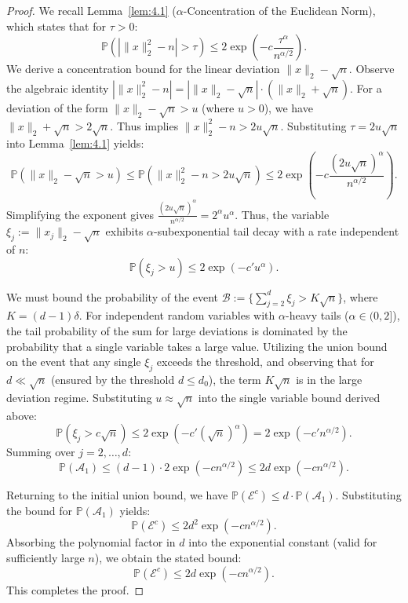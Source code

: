 \documentclass[11pt]{amsart}
\theoremstyle{definition}
\theoremstyle{remark}
\begin{document}
\begin{proof}
We recall Lemma~\ref{lem:4.1} ($\alpha$-Concentration of the Euclidean Norm), which states that for $\tau > 0$:
\begin{equation}
\mathbb{P}(|\|x\|_2^2 - n| > \tau) \le 2 \exp\left( -c \frac{\tau^\alpha}{n^{\alpha/2}} \right).
\end{equation}
We derive a concentration bound for the linear deviation $\|x\|_2 - \sqrt{n}$. Observe the algebraic identity $|\|x\|_2^2 - n| = |\|x\|_2 - \sqrt{n}| \cdot (\|x\|_2 + \sqrt{n})$. For a deviation of the form $\|x\|_2 - \sqrt{n} > u$ (where $u > 0$), we have $\|x\|_2 + \sqrt{n} > 2\sqrt{n}$. Thus implies $\|x\|_2^2 - n > 2u\sqrt{n}$. Substituting $\tau = 2u\sqrt{n}$ into Lemma~\ref{lem:4.1} yields:
\begin{equation}
\mathbb{P}(\|x\|_2 - \sqrt{n} > u) \le \mathbb{P}(\|x\|_2^2 - n > 2u\sqrt{n}) \le 2 \exp\left( -c \frac{(2u\sqrt{n})^\alpha}{n^{\alpha/2}} \right).
\end{equation}
Simplifying the exponent gives $\frac{(2u\sqrt{n})^\alpha}{n^{\alpha/2}} = 2^\alpha u^\alpha$. Thus, the variable $\xi_j := \|x_j\|_2 - \sqrt{n}$ exhibits $\alpha$-subexponential tail decay with a rate independent of $n$:
\begin{equation}
\mathbb{P}(\xi_j > u) \le 2 \exp(-c' u^\alpha).
\end{equation}

We must bound the probability of the event $\mathcal{B} := \{ \sum_{j=2}^d \xi_j > K \sqrt{n} \}$, where $K = (d-1)\delta$. For independent random variables with $\alpha$-heavy tails ($\alpha \in (0, 2]$), the tail probability of the sum for large deviations is dominated by the probability that a single variable takes a large value. Utilizing the union bound on the event that any single $\xi_j$ exceeds the threshold, and observing that for $d \ll \sqrt{n}$ (ensured by the threshold $d \le d_0$), the term $K\sqrt{n}$ is in the large deviation regime. Substituting $u \approx \sqrt{n}$ into the single variable bound derived above:
\begin{equation}
\mathbb{P}(\xi_j > c \sqrt{n}) \le 2 \exp(-c' (\sqrt{n})^\alpha) = 2 \exp(-c' n^{\alpha/2}).
\end{equation}
Summing over $j=2, \dots, d$:
\begin{equation}
\mathbb{P}(\mathcal{A}_1) \le (d-1) \cdot 2 \exp(-c n^{\alpha/2}) \le 2d \exp(-c n^{\alpha/2}).
\end{equation}

Returning to the initial union bound, we have $\mathbb{P}(\mathcal{E}^c) \le d \cdot \mathbb{P}(\mathcal{A}_1)$. Substituting the bound for $\mathbb{P}(\mathcal{A}_1)$ yields:
\begin{equation}
\mathbb{P}(\mathcal{E}^c) \le 2d^2 \exp(-c n^{\alpha/2}).
\end{equation}
Absorbing the polynomial factor in $d$ into the exponential constant (valid for sufficiently large $n$), we obtain the stated bound:
\begin{equation}
\mathbb{P}(\mathcal{E}^c) \le 2d \exp(-c n^{\alpha/2}).
\end{equation}
This completes the proof.
\end{proof}
\end{document}
